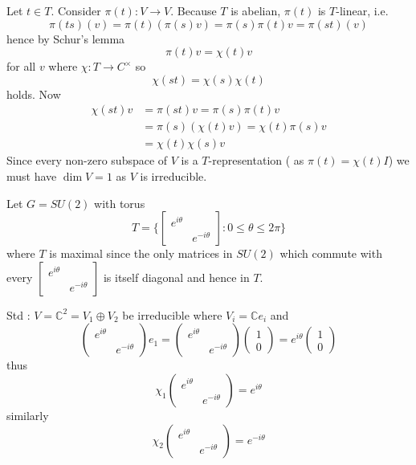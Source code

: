 \documentclass[11pt,a4paper]{scrarticle}
\theoremstyle{definition}
\renewenvironment{proof}[1][\proofname]{\vspace{-10pt}\begin{myproof}}{\end{myproof}}
\theoremstyle{greenbox}
\newcommand{\C}{\mathbb{C}}
\begin{document}
 \begin{proof}
    Let $ t \in T $. Consider $ \pi(t) : V \to V $. Because $ T $ is abelian, $ \pi(t) $ is  $ T $-linear, i.e. 
    \[ \pi(ts)(v) = \pi(t)(\pi(s)v) = \pi(s)\pi(t)v = \pi(st)(v) \]
    hence by Schur's lemma 
    \[ \pi(t) v = \chi(t)v \]
    for all $ v $ where $ \chi : T \to C^{\times} $ so 
    \[ \chi(st) = \chi(s)\chi(t) \]
    holds. Now 
    \begin{align*}
        \chi(st)v & = \pi(st)v = \pi(s)\pi(t)v \\
        & = \pi(s)(\chi(t)v) = \chi(t)\pi(s)v \\
        & = \chi(t)\chi(s)v
    \end{align*}
    Since every non-zero subspace of $ V $ is a $ T $-representation ( as $ \pi(t) = \chi(t)I $) we must have $ \dim V = 1 $ as $ V $ is irreducible. 
    
 \end{proof}

 \begin{example}
    Let $ G = SU(2) $ with  torus 
    \[ T = \biggl\{\begin{bmatrix}
        e^{i \theta} &  \\
        & e^{-i \theta} \end{bmatrix} : 0 \le \theta \le 2 \pi\biggr\} \]
        where $ T $ is maximal since the only matrices in $ SU(2) $ which commute with every $ \begin{bmatrix}
            e^{i \theta} & \\
            & e^{-i \theta}
        \end{bmatrix} $ is itself diagonal and hence in $ T $. 
 \end{example}
Std : $ V = \C^{2} = V_{1} \oplus V_{2} $ be irreducible where $ V_{i} = \C e_{i} $ and 
\[ \begin{pmatrix}
    e^{i \theta} &  \\
    & e^{-i \theta}
\end{pmatrix}e_{1} = \begin{pmatrix}
    e^{i \theta} & \\
    & e^{-i \theta}
\end{pmatrix} \begin{pmatrix}
    1 \\
    0
\end{pmatrix} = e^{i \theta} \begin{pmatrix}
    1 \\
    0
\end{pmatrix} \]
thus 
\[ \chi_{1} \begin{pmatrix}
    e^{i \theta} & \\
    & e^{-i \theta}
\end{pmatrix} = e^{i \theta}\]
similarly 
\[ \chi_{2}\begin{pmatrix}
    e^{ i \theta} & \\
    & e^{-i \theta}
\end{pmatrix}  = e^{-i \theta}\]
\end{document}
